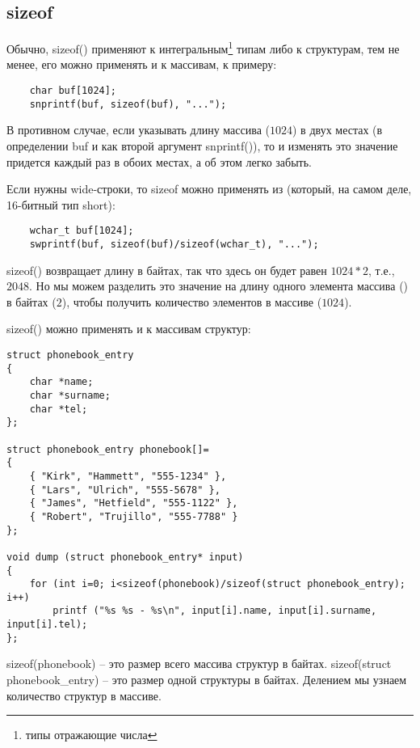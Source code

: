 ﻿\subsection{sizeof}

Обычно, sizeof() применяют к интегральным\footnote{типы отражающие числа} типам либо к структурам, 
тем не менее, его можно применять и к массивам, к примеру:


\begin{lstlisting}
	char buf[1024];
	snprintf(buf, sizeof(buf), "...");
\end{lstlisting}

В противном случае, если указывать длину массива ($1024$) в двух местах (в определении buf и как второй 
аргумент snprintf()), то и изменять это значение придется каждый раз в обоих местах, а об этом легко забыть.

Если нужны wide-строки, то sizeof можно применять из  (который, на самом деле, 16-битный тип short):

\begin{lstlisting}
	wchar_t buf[1024];
	swprintf(buf, sizeof(buf)/sizeof(wchar_t), "...");
\end{lstlisting}

sizeof() возвращает длину в байтах, так что здесь он будет равен $1024*2$, т.е., $2048$. Но мы можем
разделить это значение на длину одного элемента массива () в байтах ($2$), 
чтобы получить количество элементов в массиве ($1024$).

sizeof() можно применять и к массивам структур:

\begin{lstlisting}
struct phonebook_entry
{
	char *name;
	char *surname;
	char *tel;
};

struct phonebook_entry phonebook[]=
{
	{ "Kirk", "Hammett", "555-1234" },
	{ "Lars", "Ulrich", "555-5678" },
	{ "James", "Hetfield", "555-1122" },
	{ "Robert", "Trujillo", "555-7788" }
};

void dump (struct phonebook_entry* input)
{
	for (int i=0; i<sizeof(phonebook)/sizeof(struct phonebook_entry); i++)
		printf ("%s %s - %s\n", input[i].name, input[i].surname, input[i].tel);
};
\end{lstlisting}

sizeof(phonebook) -- это размер всего массива структур в байтах. sizeof(struct phonebook\_entry) -- 
это размер одной структуры в байтах.
Делением мы узнаем количество структур в массиве.

